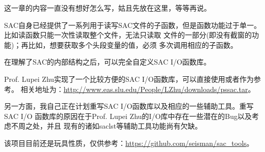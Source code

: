 这一章的内容一直没有想好怎么写，姑且先放在这里，等等再说。

SAC自身已经提供了一系列用于读写SAC文件的子函数，但是函数功能过于单一。
比如读函数只能一次性读取整个文件，无法只读取
文件的一部分(即没有截窗的功能)；再比如，想要获取多个头段变量的值，必须
多次调用相应的子函数。

在理解了SAC的内部结构之后，可以完全自定义SAC I/O函数库。

Prof. Lupei Zhu实现了一个比较方便的SAC I/O函数库，可以直接使用或者作为参考。
相关地址为：\url{http://www.eas.slu.edu/People/LZhu/downloads/pssac.tar}。

另一方面，我自己正在计划重写SAC I/O函数库以及相应的一些辅助工具。重写SAC I/O
函数库的原因在于Prof. Lupei Zhu的I/O库中存在一些潜在的Bug以及考虑不周之处，并且
现有的诸如saclst等辅助工具功能尚有欠缺。

该项目目前还是玩具性质，仅供参考：\url{https://github.com/seisman/sac_tools}。
